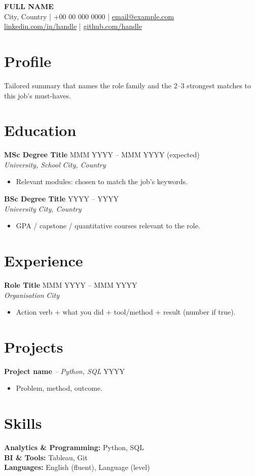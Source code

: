 \documentclass[11pt,a4paper]{article}
\newcommand{\entry}[4]{\textbf{#1} \hfill #2\\ \textit{#3} \hfill \textit{#4}\par}
\begin{document}
{\centering
{\LARGE\bfseries FULL NAME}\\[3pt]
City, Country \;|\; +00 00 000 0000 \;|\; \href{mailto:email@example.com}{email@example.com}\\
\href{https://linkedin.com/in/handle}{linkedin.com/in/handle} \;|\; \href{https://github.com/handle}{github.com/handle}\par}

\section{Profile}
Tailored summary that names the role family and the 2--3 strongest matches to this job's must-haves.

\section{Education}
\entry{MSc Degree Title}{MMM YYYY -- MMM YYYY (expected)}{University, School}{City, Country}
\begin{itemize}
  \item Relevant modules: chosen to match the job's keywords.
\end{itemize}

\vspace{4pt}
\entry{BSc Degree Title}{YYYY -- YYYY}{University}{City, Country}
\begin{itemize}
  \item GPA / capstone / quantitative courses relevant to the role.
\end{itemize}

\section{Experience}
\entry{Role Title}{MMM YYYY -- MMM YYYY}{Organisation}{City}
\begin{itemize}
  \item Action verb + what you did + tool/method + result (number if true).
\end{itemize}

\section{Projects}
\textbf{Project name} \textit{-- Python, SQL} \hfill YYYY
\begin{itemize}
  \item Problem, method, outcome.
\end{itemize}

\section{Skills}
\textbf{Analytics \& Programming:} Python, SQL \\
\textbf{BI \& Tools:} Tableau, Git \\
\textbf{Languages:} English (fluent), Language (level)

\end{document}
